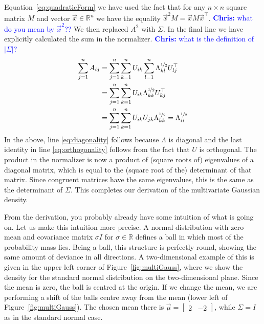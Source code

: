 \documentclass[a4paper,11pt,leqno]{report}\usepackage[]{graphicx}\usepackage[]{color}
\newcommand{\chris}[1]{ \textcolor{blue}{\textbf{Chris:} #1}}
\begin{document}
Equation~\eqref{eq:quadraticForm} we have 
used the fact that for any $ n\times n $ square matrix $ M $ and vector $ \vec{x} \in \mathbb{R}^{n} $ we have the equality $ \vec{x}^{2}M = \vec{x}M\vec{x}^{\top} $. \chris{what do you mean by $\vec{x}^{2}$??}
We then replaced $ A^{2} $ with $ \Sigma $. In the final line we have explicitly calculated the sum in the normalizer. \chris{what is the definition of $|\Sigma|$?}
\begin{align}
\sum_{j=1}^{n}A_{ij} &= \sum_{j=1}^{n} \sum_{k=1}^{n} U_{ik} \sum_{l=1}^{n} \Lambda^{\nicefrac{1}{2}}_{kl} U^{\top}_{lj} \\
&= \sum_{j=1}^{n} \sum_{k=1}^{n} U_{ik} \Lambda^{\nicefrac{1}{2}}_{kk} U^{\top}_{kj} \label{eq:diagonality} \\
&= \sum_{j=1}^{n} \sum_{k=1}^{n} U_{ik} U_{jk} \Lambda_{kk}^{\nicefrac{1}{2}} = \Lambda_{ii}^{\nicefrac{1}{2}} \label{eq:orthogonality}
\end{align}
In the above, line \eqref{eq:diagonality} follows because $ \Lambda $ is diagonal and the last identity in line \eqref{eq:orthogonality} follows from the fact that
$ U $ is orthogonal. The product in the normalizer is now a product of (square roots of) eigenvalues of a diagonal matrix, which is equal to the (square root of the) 
determinant of that matrix. Since congruent matrices have the same eigenvalues, this is the same as the determinant of $ \Sigma $. This completes our derivation of the multivariate Gaussian density.

From the derivation, you probably already have some intuition of what is going on. Let us make this intuition more precise. A normal distribution with zero mean
and covariance matrix $ \sigma I $ for $ \sigma \in \mathbb{R} $ defines a ball in which most of the probability mass lies. Being a ball, this structure is perfectly
round, showing the same amount of deviance in all directions. A two-dimensional example of this is given in the upper left corner of Figure~\ref{fig:multiGauss}, where
we show the density for the standard normal distribution on the two-dimensional plane. 
Since the mean is zero, the ball is centred at the origin. If we change the mean, we are 
performing a shift of the balls centre away from the mean (lower left of Figure~\ref{fig:multiGauss}). The chosen mean there is 
$ \vec{\mu} = \begin{bmatrix}
2 & -2
\end{bmatrix} $, while $ \Sigma = I $ as in the standard normal case.
\end{document}
